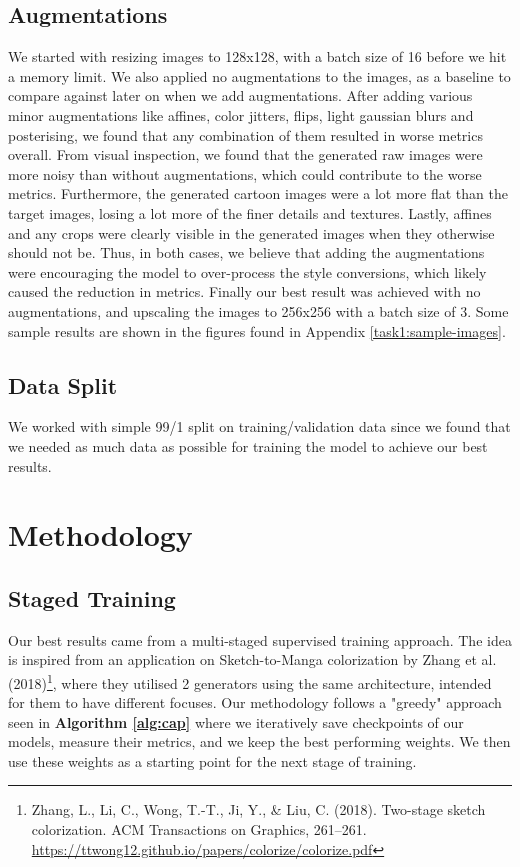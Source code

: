 \documentclass[twoside,english,notitlepage]{report}
\begin{document}
\subsection{Augmentations}
We started with resizing images to 128x128, with a batch size of 16 before we hit a memory limit. We also applied no augmentations to the images, as a baseline to compare against later on when we add augmentations.
\noindent After adding various minor augmentations like affines, color jitters, flips, light gaussian blurs and posterising, we found that any combination of them resulted in worse metrics overall. From visual inspection, we found that the generated raw images were more noisy than without augmentations, which could contribute to the worse metrics. Furthermore, the generated cartoon images were a lot more flat than the target images, losing a lot more of the finer details and textures. Lastly, affines and any crops were clearly visible in the generated images when they otherwise should not be.
\noindent Thus, in both cases, we believe that adding the augmentations were encouraging the model to over-process the style conversions, which likely caused the reduction in metrics. Finally our best result was achieved with no augmentations, and upscaling the images to 256x256 with a batch size of 3. Some sample results are shown in the figures found in Appendix \ref{task1:sample-images}.


\subsection{Data Split}
We worked with simple 99/1 split on training/validation data since we found that we needed as much data as possible for training the model to achieve our best results. \\

\section{Methodology}

\subsection{Staged Training}\label{task1:staged-training}
Our best results came from a multi-staged supervised training approach. The idea is inspired from an application on Sketch-to-Manga colorization by Zhang et al. (2018)\footnote{Zhang, L., Li, C., Wong, T.-T., Ji, Y., \& Liu, C. (2018). Two-stage sketch colorization. ACM Transactions on Graphics, 261–261. \href{https://ttwong12.github.io/papers/colorize/colorize.pdf}{https://ttwong12.github.io/papers/colorize/colorize.pdf}}, where they utilised 2 generators using the same architecture, intended for them to have different focuses. 
Our methodology follows a "greedy" approach seen in \textbf{Algorithm \ref{alg:cap}} where we iteratively save checkpoints of our models, measure their metrics, and we keep the best performing weights. We then use these weights as a starting point for the next stage of training.
\end{document}
